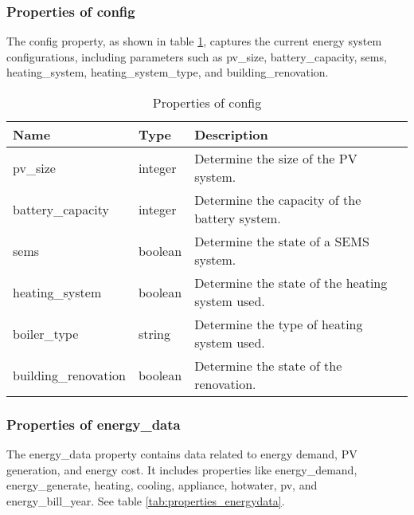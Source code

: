 \subsubsection{Properties of config}

The config property, as shown in table \ref{tab:properties_config}, captures the current energy system configurations, including parameters such as pv\_size, battery\_capacity, sems, heating\_system, heating\_system\_type, and building\_renovation.

\begin{table}[h!]
    \centering
    \scriptsize
    \begin{tabular}{ | p{} | p{} | p{} | } 
    \hline
    Name & Type & Description \\
    \hline
    pv\_size & integer & Determine the size of the PV system. \\
    \hline
    battery\_capacity & integer & Determine the capacity of the battery system. \\
    \hline
    sems & boolean & Determine the state of a SEMS system. \\
    \hline
    heating\_system & boolean & Determine the state of the heating system used. \\
    \hline
    boiler\_type & string & Determine the type of heating system used. \\
    \hline
    building\_renovation & boolean & Determine the state of the renovation. \\
    \hline
    \end{tabular}
    \caption{Properties of config}
    \label{tab:properties_config}
\end{table}


\subsubsection{Properties of energy\_data}

The energy\_data property contains data related to energy demand, PV generation, and energy cost. 
It includes properties like energy\_demand, energy\_generate, heating, cooling, appliance, hotwater, pv, and energy\_bill\_year.
See table \ref{tab:properties_energydata}. 

